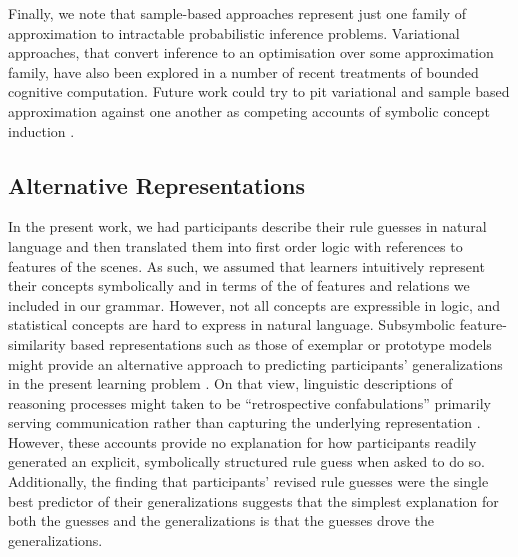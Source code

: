\documentclass[doc,natbib,floatsintext]{apa7}
\begin{document}
Finally, we note that sample-based approaches represent just one family of approximation to intractable probabilistic inference problems. Variational approaches, that convert inference to an optimisation over some approximation family, have also been explored in a number of recent treatments of bounded cognitive computation. Future work could try to pit variational and sample based approximation against one another as competing accounts of symbolic concept induction \citep{sanborn2017types}.


\subsection{Alternative Representations}
In the present work, we had participants describe their rule guesses in natural language and then translated them into first order logic with references to features of the scenes. As such, we assumed that learners intuitively represent their concepts symbolically and %
in terms of the of features and relations we included in our grammar. However, not all concepts are expressible in logic, and statistical concepts are hard to express in natural language. Subsymbolic feature-similarity based representations such as those of exemplar or prototype models might provide an alternative approach to predicting participants' generalizations in the present learning problem \citep{medin1978context,nosofsky1986attention,rosch1999principles}. On that view, linguistic descriptions of reasoning processes might taken to be ``retrospective confabulations'' primarily serving communication rather than capturing the underlying representation \citep{dennett1981making}.  
However, these accounts provide no explanation for how participants readily generated an explicit, symbolically structured rule guess when asked to do so. Additionally, the finding that participants' revised rule guesses were the single best predictor of their generalizations suggests that the simplest explanation for both the guesses and the generalizations is that the guesses drove the generalizations. 
\end{document}
